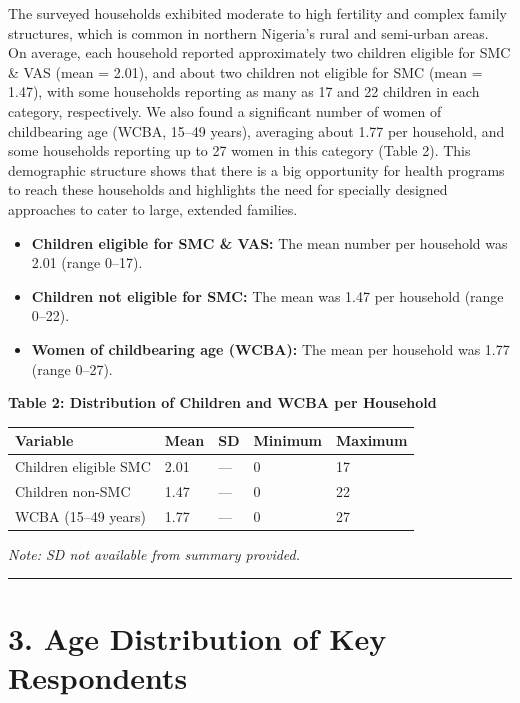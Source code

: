 \documentclass[
  11pt,
]{report}
\providecommand{\tightlist}{%
  \setlength{\itemsep}{0pt}\setlength{\parskip}{0pt}}
\begin{document}
The surveyed households exhibited moderate to high fertility and complex
family structures, which is common in northern Nigeria's rural and
semi-urban areas. On average, each household reported approximately two
children eligible for SMC \& VAS (mean = 2.01), and about two children
not eligible for SMC (mean = 1.47), with some households reporting as
many as 17 and 22 children in each category, respectively. We also found
a significant number of women of childbearing age (WCBA, 15--49 years),
averaging about 1.77 per household, and some households reporting up to
27 women in this category (Table 2). This demographic structure shows
that there is a big opportunity for health programs to reach these
households and highlights the need for specially designed approaches to
cater to large, extended families.

\begin{itemize}
\tightlist
\item
  \textbf{Children eligible for SMC \& VAS:} The mean number per
  household was 2.01 (range 0--17).
\item
  \textbf{Children not eligible for SMC:} The mean was 1.47 per
  household (range 0--22).
\item
  \textbf{Women of childbearing age (WCBA):} The mean per household was
  1.77 (range 0--27).
\end{itemize}

\textbf{Table 2: Distribution of Children and WCBA per Household}

\begin{longtable}[]{@{}lllll@{}}
\toprule\noalign{}
Variable & Mean & SD & Minimum & Maximum \\
\midrule\noalign{}
\endhead
\bottomrule\noalign{}
\endlastfoot
Children eligible SMC & 2.01 & --- & 0 & 17 \\
Children non-SMC & 1.47 & --- & 0 & 22 \\
WCBA (15--49 years) & 1.77 & --- & 0 & 27 \\
\end{longtable}

\emph{Note: SD not available from summary provided.}

\begin{center}\rule{0.5\linewidth}{0.5pt}\end{center}

\section{3. Age Distribution of Key
Respondents}\label{age-distribution-of-key-respondents}
\end{document}
